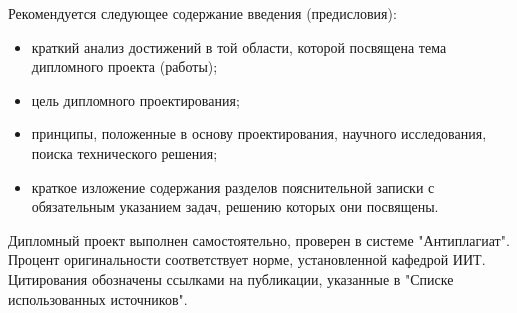 
Рекомендуется следующее содержание введения (предисловия):
\begin{itemize}
\item краткий анализ достижений в той области, которой посвящена тема дипломного проекта (работы);
\item цель дипломного проектирования;
\item принципы, положенные в основу проектирования, научного исследования, поиска технического решения;
\item краткое изложение содержания разделов пояснительной записки с обязательным указанием задач, решению которых они посвящены.
\end{itemize}

Дипломный проект выполнен самостоятельно, проверен в системе "Антиплагиат". Процент оригинальности соответствует норме, установленной кафедрой ИИТ. Цитирования обозначены ссылками на публикации, указанные в "Списке использованных источников".